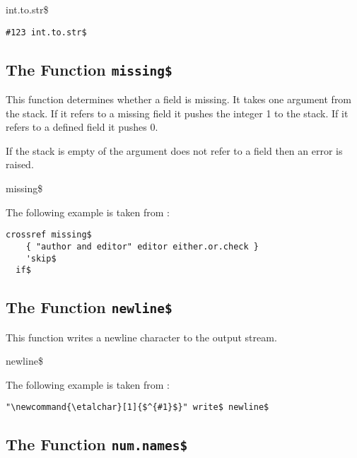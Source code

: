\begin{BstFunction}{int.to.str\$}
\end{BstFunction}

\begin{lstlisting}[language=bst]
  #123 int.to.str$
\end{lstlisting}


\subsection{The Function \texttt{missing\$}}%

This function determines whether a field is missing. It takes one
argument from the stack. If it refers to a missing field it pushes the
integer 1 to the stack. If it refers to a defined field it pushes 0.

If the stack is empty of the argument does not refer to a field then
an error is raised.
 
\begin{BstFunction}{missing\$}
\end{BstFunction}

The following example is taken from :

\begin{lstlisting}[language=bst]
    crossref missing$
    { "author and editor" editor either.or.check }
    'skip$
  if$
\end{lstlisting}


\subsection{The Function \texttt{newline\$}}%

This function writes a newline character to the output stream.

\begin{BstFunction}{newline\$}
\end{BstFunction}

The following example is taken from :

\begin{lstlisting}[language=bst]
  "\newcommand{\etalchar}[1]{$^{#1}$}" write$ newline$
\end{lstlisting}


\subsection{The Function \texttt{num.names\$}}%

